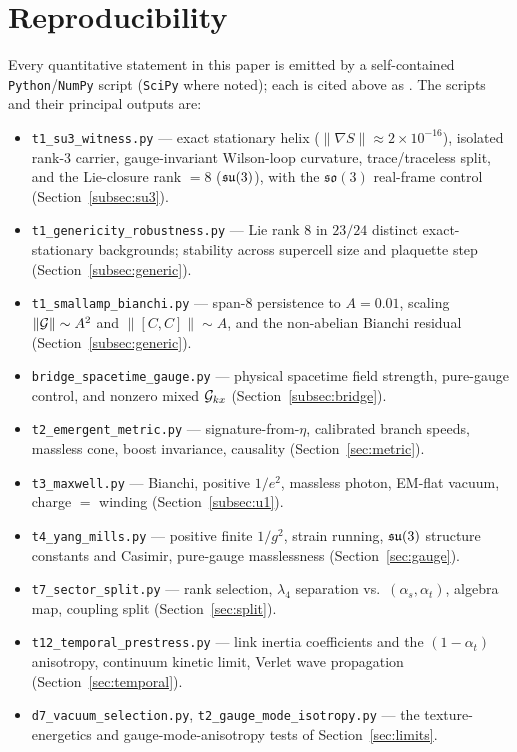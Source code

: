 \section{Reproducibility}
\label{app:repro}

Every quantitative statement in this paper is emitted by a self-contained
\texttt{Python}/\texttt{NumPy} script (\texttt{SciPy} where noted); each is cited above as
\citep{repo}. The scripts and their principal outputs are:

\begin{itemize}
  \item \texttt{t1\_su3\_witness.py} --- exact stationary helix ($\|\nabla S\|\approx 2\times10^{-16}$),
  isolated rank-3 carrier, gauge-invariant Wilson-loop curvature, trace/traceless split, and the
  Lie-closure rank $=8$ ($\mathfrak{su}(3)$), with the $\mathfrak{so}(3)$ real-frame control
  (Section~\ref{subsec:su3}).
  \item \texttt{t1\_genericity\_robustness.py} --- Lie rank $8$ in $23/24$ distinct
  exact-stationary backgrounds; stability across supercell size and plaquette step
  (Section~\ref{subsec:generic}).
  \item \texttt{t1\_smallamp\_bianchi.py} --- span-$8$ persistence to $A=0.01$, scaling
  $\|\mathcal{G}\|\sim A^2$ and $\|[C,C]\|\sim A$, and the non-abelian Bianchi residual
  (Section~\ref{subsec:generic}).
  \item \texttt{bridge\_spacetime\_gauge.py} --- physical spacetime field strength, pure-gauge
  control, and nonzero mixed $\mathcal{G}_{kx}$ (Section~\ref{subsec:bridge}).
  \item \texttt{t2\_emergent\_metric.py} --- signature-from-$\eta$, calibrated branch speeds,
  massless cone, boost invariance, causality (Section~\ref{sec:metric}).
  \item \texttt{t3\_maxwell.py} --- Bianchi, positive $1/e^2$, massless photon, EM-flat vacuum,
  charge $=$ winding (Section~\ref{subsec:u1}).
  \item \texttt{t4\_yang\_mills.py} --- positive finite $1/g^2$, strain running, $\mathfrak{su}(3)$
  structure constants and Casimir, pure-gauge masslessness (Section~\ref{sec:gauge}).
  \item \texttt{t7\_sector\_split.py} --- rank selection, $\lambda_4$ separation vs.\
  $(\alpha_s,\alpha_t)$, algebra map, coupling split (Section~\ref{sec:split}).
  \item \texttt{t12\_temporal\_prestress.py} --- link inertia coefficients and the $(1-\alpha_t)$
  anisotropy, continuum kinetic limit, Verlet wave propagation (Section~\ref{sec:temporal}).
  \item \texttt{d7\_vacuum\_selection.py}, \texttt{t2\_gauge\_mode\_isotropy.py} --- the
  texture-energetics and gauge-mode-anisotropy tests of Section~\ref{sec:limits}.
\end{itemize}

